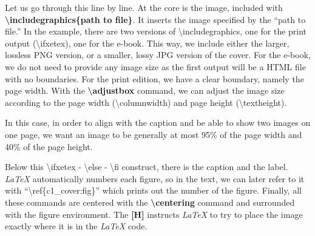 Let us go through this line by line. At the core is the image, included with \textbf{\textbackslash includegraphics\{path to file\}}. It inserts the image specified by the ``path to file.'' In the example, there are two versions of \textbackslash includegraphics, one for the print output (\textbackslash ifxetex), one for the e-book. This way, we include either the larger, lossless PNG version, or a smaller, lossy JPG version of the cover. For the e-book, we do not need to provide any image size as the first output will be a HTML file with no boundaries. For the print edition, we have a clear boundary, namely the page width. With the \textbf{\textbackslash adjustbox} command, we can adjust the image size according to the page width (\textbackslash columnwidth) and page height (\textbackslash textheight). 

In this case, in order to align with the caption and be able to show two images on one page, we want an image to be generally at most 95\% of the page width and 40\% of the page height.

Below this \textbackslash ifxetex - \textbackslash else - \textbackslash fi construct, there is the caption and the label. \textit{LaTeX} automatically numbers each figure, so in the text, we can later refer to it with ``\textbackslash ref\{c1\_cover:fig\}'' which prints out the number of the figure. Finally, all these commands are centered with the \textbf{\textbackslash centering} command and surrounded with the figure environment. The \textbf{[H]} instructs \textit{LaTeX} to try to place the image exactly where it is in the \textit{LaTeX} code. 


